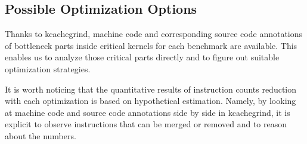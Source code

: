 \medskip
\begin{table}[h!]
    \centering
    \caption{Bottleneck in kernel. \textbf{bottleneck(abs)} refers to instruction counts of bottleneck part, whereas \textbf{bottleneck(rel)} is \textbf{bottleneck(abs)} divided by total number of instructions of the kernel.}
    \label{tab:muriscv_nn_bottleneck}
\end{table}

\subsection{Possible Optimization Options}
Thanks to kcachegrind, machine code and corresponding source code annotations of bottleneck parts inside critical kernels for each benchmark are available. This enables us to analyze those critical parts directly and to figure out suitable optimization strategies.

It is worth noticing that the quantitative results of instruction counts reduction with each optimization is based on hypothetical estimation. Namely, by looking at machine code and source code annotations side by side in kcachegrind, it is explicit to observe instructions that can be merged or removed and to reason about the numbers.

